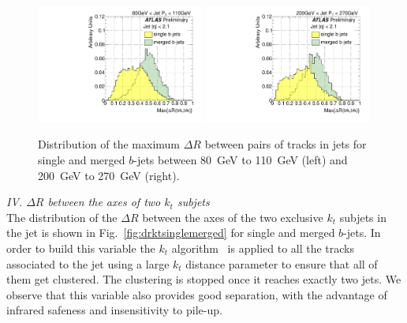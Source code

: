 \begin{figure}[tp]
\centering
\includegraphics[width=0.49\textwidth]{FIGS/VarsSingleMerged/drmax080.pdf}
\includegraphics[width=0.49\textwidth]{FIGS/VarsSingleMerged/drmax200.pdf}
\caption{Distribution of the maximum $\Delta R$ between pairs of tracks in jets for single and merged $b$-jets between 80~GeV to 110~GeV (left) and 200~GeV to 270~GeV (right).}
\label{fig:drmaxsinglemerged}
\end{figure}


{ \em IV. $\Delta R$ between the axes of two $k_t$ subjets}
\\[3mm]
The distribution of the $\Delta R$ between the axes of the two exclusive $k_t$ subjets in the jet is shown in Fig.~\ref{fig:drktsinglemerged} for single and merged $b$-jets. In order to build this variable the $k_t$ algorithm~\cite{kt1} is applied to all the tracks associated to the jet using a large $k_t$  distance parameter to ensure that all of them get clustered. The clustering is stopped once it reaches exactly two jets. We observe that this variable also provides good separation, with the advantage of infrared safeness and insensitivity to pile-up. %
\\[3mm]

